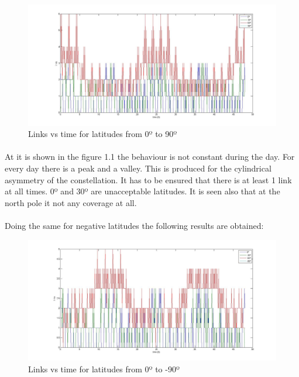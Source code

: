 \documentclass[12pt,a4paper]{report}
\begin{document}
\begin{figure}[H]
\begin{center}
\includegraphics[scale=0.30]{0_30_90_lat.jpg}
\caption{Links vs time for latitudes from 0º to 90º}
\end{center}
\end{figure}

\paragraph{}
At it is shown in the figure 1.1 the behaviour is not constant during the day. For every day there is a peak and a valley. This is produced for the cylindrical asymmetry of the constellation. It has to be ensured that there is at least 1 link at all times. 0º and 30º are unacceptable latitudes. It is seen also that at the north pole it not any coverage at all.
\paragraph{}
Doing the same for negative latitudes the following results are obtained:

\begin{figure}[H]
\begin{center}
\includegraphics[scale=0.30]{0_-30_-90_lat.jpg}
\caption{Links vs time for latitudes from 0º to -90º}
\end{center}
\end{figure}
\end{document}
